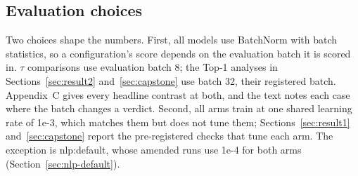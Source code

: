 \subsection{Evaluation choices}
\label{sec:eval-choices}
Two choices shape the numbers. First, all models use BatchNorm with batch statistics, so a
configuration's score depends on the evaluation batch it is scored in. $\tau$ comparisons use
evaluation batch 8; the Top-1 analyses in Sections~\ref{sec:result2} and~\ref{sec:capstone} use batch
32, their registered batch. Appendix~C gives every headline contrast at both, and the text notes each
case where the batch changes a verdict. Second, all arms train at one shared learning rate of 1e-3,
which matches them but does not tune them; Sections~\ref{sec:result1} and~\ref{sec:capstone} report the
pre-registered checks that tune each arm. The exception is nlp:default, whose amended runs use 1e-4 for
both arms (Section~\ref{sec:nlp-default}).
